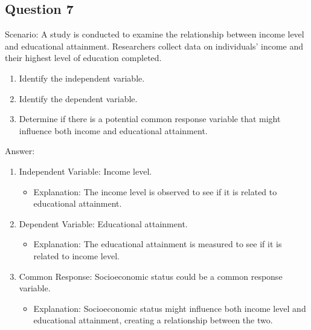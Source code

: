 \documentclass[
  letterpaper,
  DIV=11,
  numbers=noendperiod]{scrreprt}
\providecommand{\tightlist}{%
  \setlength{\itemsep}{0pt}\setlength{\parskip}{0pt}}\usepackage{longtable,booktabs,array}
\begin{document}
\subsection*{Question 7}\label{question-7}

Scenario: A study is conducted to examine the relationship between
income level and educational attainment. Researchers collect data on
individuals' income and their highest level of education completed.

\begin{enumerate}
\def\labelenumi{\arabic{enumi}.}
\tightlist
\item
  Identify the independent variable.
\item
  Identify the dependent variable.
\item
  Determine if there is a potential common response variable that might
  influence both income and educational attainment.
\end{enumerate}

Answer:

\begin{enumerate}
\def\labelenumi{\arabic{enumi}.}
\tightlist
\item
  Independent Variable: Income level.

  \begin{itemize}
  \tightlist
  \item
    Explanation: The income level is observed to see if it is related to
    educational attainment.
  \end{itemize}
\item
  Dependent Variable: Educational attainment.

  \begin{itemize}
  \tightlist
  \item
    Explanation: The educational attainment is measured to see if it is
    related to income level.
  \end{itemize}
\item
  Common Response: Socioeconomic status could be a common response
  variable.

  \begin{itemize}
  \tightlist
  \item
    Explanation: Socioeconomic status might influence both income level
    and educational attainment, creating a relationship between the two.
  \end{itemize}
\end{enumerate}
\end{document}
